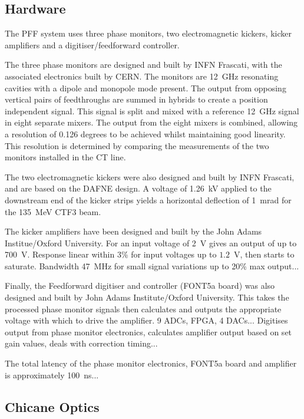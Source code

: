 \documentclass[%
 reprint,
 amsmath,amssymb,
 aps,
]{revtex4-1}
\begin{document}
\subsection{\label{ss:hardware}Hardware}

The PFF system uses three phase monitors, two electromagnetic kickers, kicker 
amplifiers and a digitiser/feedforward controller.

The three phase monitors are designed and built by INFN Frascati, with the 
associated electronics built by CERN. The monitors are 12~GHz resonating 
cavities with a dipole and monopole mode present. The output from opposing 
vertical pairs of feedthroughs are summed in hybrids to create a position 
independent signal. This signal is split and mixed with a reference 12~GHz 
signal in eight separate mixers. The output from the eight mixers is combined, 
allowing a resolution of 0.126 degrees to be 
achieved whilst maintaining good linearity. This resolution is determined by 
comparing the measurements of the two monitors installed in the CT line.

The two electromagnetic kickers were also designed and built by INFN Frascati,  
and are based on the DAFNE design. A voltage of 1.26~kV applied to the 
downstream end of the kicker strips yields a horizontal deflection of 1~mrad 
for the 135~MeV CTF3 beam.

The kicker amplifiers have been designed and built by the John Adams 
Institue/Oxford University. For 
an input voltage of 2~V gives an output of up to 700~V. Response linear within 
3\% for input voltages up to \(1.2\)~V, then starts to saturate. Bandwidth 
47~MHz for small signal variations up to 20\% max output...

Finally, the Feedforward digitiser and controller (FONT5a board) was also 
designed and built by John Adams Institute/Oxford University. This takes the 
processed phase monitor signals then calculates and outputs the appropriate 
voltage with which to drive the amplifier. 9 ADCs, FPGA, 4 DACs... Digitises 
output from phase monitor electronics, calculates amplifier output based on set 
gain values, deals with correction timing...

The total latency of the phase monitor electronics, FONT5a board and amplifier 
is approximately 100~ns...

\subsection{\label{ss:optics}Chicane Optics}
\end{document}

